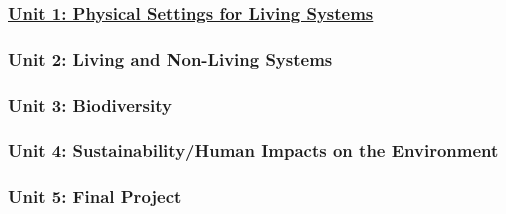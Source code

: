 \documentclass[
]{article}
\begin{document}
\hypertarget{unit-1-physical-settings-for-living-systems}{%
\subsubsection{\texorpdfstring{\href{}{Unit 1: Physical Settings for
Living
Systems}}{Unit 1: Physical Settings for Living Systems}}\label{unit-1-physical-settings-for-living-systems}}

\hypertarget{unit-2-living-and-non-living-systems}{%
\subsubsection{Unit 2: Living and Non-Living
Systems}\label{unit-2-living-and-non-living-systems}}

\hypertarget{unit-3-biodiversity}{%
\subsubsection{Unit 3: Biodiversity}\label{unit-3-biodiversity}}

\hypertarget{unit-4-sustainabilityhuman-impacts-on-the-environment}{%
\subsubsection{Unit 4: Sustainability/Human Impacts on the
Environment}\label{unit-4-sustainabilityhuman-impacts-on-the-environment}}

\hypertarget{unit-5-final-project}{%
\subsubsection{Unit 5: Final Project}\label{unit-5-final-project}}
\end{document}
